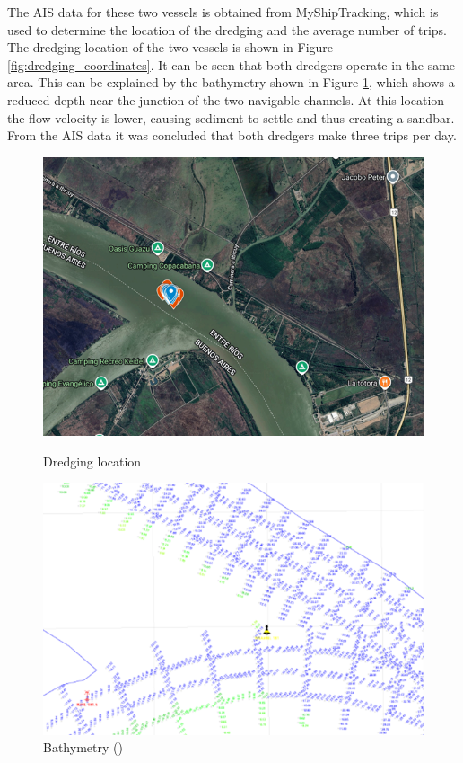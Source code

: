 The AIS data for these two vessels is obtained from MyShipTracking, which is used to determine the location of the dredging and the average number of trips. The dredging location of the two vessels is shown in Figure \ref{fig:dredging_coordinates}. It can be seen that both dredgers operate in the same area. This can be explained by the bathymetry shown in Figure \ref{fig:bathymetry}, which shows a reduced depth near the junction of the two navigable channels. At this location the flow velocity is lower, causing sediment to settle and thus creating a sandbar. From the AIS data it was concluded that both dredgers make three trips per day.

\begin{figure}[H]
    \centering
    \begin{minipage}{0.48\textwidth}
        \centering
        \includegraphics[width=\linewidth]{figures/ch5/Dredging_coordinates.png}
        \caption{Dredging location \autocite{googleGoogleEarth2025}}
        \label{fig:dredging_coordinates}
    \end{minipage}\hfill
    \begin{minipage}{0.48\textwidth}
        \centering
        \includegraphics[width=\linewidth]{figures/ch5/Bathymetry.png}
        \caption{Bathymetry (\cite{agencianacionaldepuertosynavegacionNavegableTroncal2025})}
        \label{fig:bathymetry}
    \end{minipage}
\end{figure}

